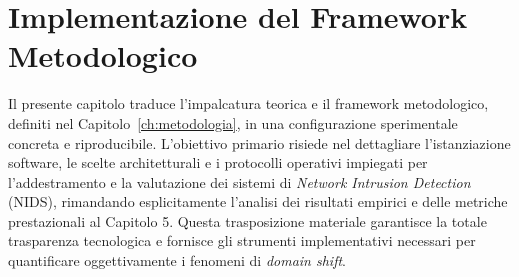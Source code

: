 \chapter{Implementazione del Framework Metodologico}
\label{ch:implementazione}

Il presente capitolo traduce l'impalcatura teorica e il framework metodologico, definiti nel Capitolo~\ref{ch:metodologia}, in una configurazione sperimentale concreta e riproducibile. 
L'obiettivo primario risiede nel dettagliare l'istanziazione software, le scelte architetturali e i protocolli operativi impiegati per l'addestramento e la valutazione dei sistemi di \textit{Network Intrusion Detection} (NIDS), rimandando esplicitamente l'analisi dei risultati empirici e delle metriche prestazionali al Capitolo 5. 
Questa trasposizione materiale garantisce la totale trasparenza tecnologica e fornisce gli strumenti implementativi necessari per quantificare oggettivamente i fenomeni di \textit{domain shift}.

